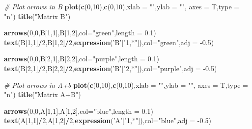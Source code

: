 \documentclass[
]{book}
\newenvironment{Shaded}{\begin{snugshade}}{\end{snugshade}}
\newcommand{\CommentTok}[1]{\textcolor[rgb]{0.56,0.35,0.01}{\textit{#1}}}
\newcommand{\DataTypeTok}[1]{\textcolor[rgb]{0.13,0.29,0.53}{#1}}
\newcommand{\DecValTok}[1]{\textcolor[rgb]{0.00,0.00,0.81}{#1}}
\newcommand{\FloatTok}[1]{\textcolor[rgb]{0.00,0.00,0.81}{#1}}
\newcommand{\KeywordTok}[1]{\textcolor[rgb]{0.13,0.29,0.53}{\textbf{#1}}}
\newcommand{\NormalTok}[1]{#1}
\newcommand{\OperatorTok}[1]{\textcolor[rgb]{0.81,0.36,0.00}{\textbf{#1}}}
\newcommand{\StringTok}[1]{\textcolor[rgb]{0.31,0.60,0.02}{#1}}
\theoremstyle{definition}
\theoremstyle{definition}
\theoremstyle{definition}
\theoremstyle{remark}
\begin{document}
\begin{Shaded}
\begin{Highlighting}[]
\CommentTok{# Plot arrows in B}
\KeywordTok{plot}\NormalTok{(}\KeywordTok{c}\NormalTok{(}\DecValTok{0}\NormalTok{,}\DecValTok{10}\NormalTok{),}\KeywordTok{c}\NormalTok{(}\DecValTok{0}\NormalTok{,}\DecValTok{10}\NormalTok{),}\DataTypeTok{xlab =} \StringTok{""}\NormalTok{,}\DataTypeTok{ylab =} \StringTok{""}\NormalTok{,}
 \DataTypeTok{axes =}\NormalTok{ T,}\DataTypeTok{type =} \StringTok{"n"}\NormalTok{)}
\KeywordTok{title}\NormalTok{(}\StringTok{"Matrix B"}\NormalTok{)}

\KeywordTok{arrows}\NormalTok{(}\DecValTok{0}\NormalTok{,}\DecValTok{0}\NormalTok{,B[}\DecValTok{1}\NormalTok{,}\DecValTok{1}\NormalTok{],B[}\DecValTok{1}\NormalTok{,}\DecValTok{2}\NormalTok{],}\DataTypeTok{col=}\StringTok{"green"}\NormalTok{,}\DataTypeTok{length =} \FloatTok{0.1}\NormalTok{)}
\KeywordTok{text}\NormalTok{(B[}\DecValTok{1}\NormalTok{,}\DecValTok{1}\NormalTok{]}\OperatorTok{/}\DecValTok{2}\NormalTok{,B[}\DecValTok{1}\NormalTok{,}\DecValTok{2}\NormalTok{]}\OperatorTok{/}\DecValTok{2}\NormalTok{,}\KeywordTok{expression}\NormalTok{(}\StringTok{'B'}\NormalTok{[}\StringTok{"1,*"}\NormalTok{]),}\DataTypeTok{col=}\StringTok{"green"}\NormalTok{,}\DataTypeTok{adj =} \FloatTok{-0.5}\NormalTok{)}

\KeywordTok{arrows}\NormalTok{(}\DecValTok{0}\NormalTok{,}\DecValTok{0}\NormalTok{,B[}\DecValTok{2}\NormalTok{,}\DecValTok{1}\NormalTok{],B[}\DecValTok{2}\NormalTok{,}\DecValTok{2}\NormalTok{],}\DataTypeTok{col=}\StringTok{"purple"}\NormalTok{,}\DataTypeTok{length =} \FloatTok{0.1}\NormalTok{)}
\KeywordTok{text}\NormalTok{(B[}\DecValTok{2}\NormalTok{,}\DecValTok{1}\NormalTok{]}\OperatorTok{/}\DecValTok{2}\NormalTok{,B[}\DecValTok{2}\NormalTok{,}\DecValTok{2}\NormalTok{]}\OperatorTok{/}\DecValTok{2}\NormalTok{,}\KeywordTok{expression}\NormalTok{(}\StringTok{'B'}\NormalTok{[}\StringTok{"2,*"}\NormalTok{]),}\DataTypeTok{col=}\StringTok{"purple"}\NormalTok{,}\DataTypeTok{adj =} \FloatTok{-0.5}\NormalTok{)}

\CommentTok{# Plot arrows in A+b}
\KeywordTok{plot}\NormalTok{(}\KeywordTok{c}\NormalTok{(}\DecValTok{0}\NormalTok{,}\DecValTok{10}\NormalTok{),}\KeywordTok{c}\NormalTok{(}\DecValTok{0}\NormalTok{,}\DecValTok{10}\NormalTok{),}\DataTypeTok{xlab =} \StringTok{""}\NormalTok{,}\DataTypeTok{ylab =} \StringTok{""}\NormalTok{,}
 \DataTypeTok{axes =}\NormalTok{ T,}\DataTypeTok{type =} \StringTok{"n"}\NormalTok{)}
\KeywordTok{title}\NormalTok{(}\StringTok{"Matrix A+B"}\NormalTok{)}


\KeywordTok{arrows}\NormalTok{(}\DecValTok{0}\NormalTok{,}\DecValTok{0}\NormalTok{,A[}\DecValTok{1}\NormalTok{,}\DecValTok{1}\NormalTok{],A[}\DecValTok{1}\NormalTok{,}\DecValTok{2}\NormalTok{],}\DataTypeTok{col=}\StringTok{"blue"}\NormalTok{,}\DataTypeTok{length =} \FloatTok{0.1}\NormalTok{)}
\KeywordTok{text}\NormalTok{(A[}\DecValTok{1}\NormalTok{,}\DecValTok{1}\NormalTok{]}\OperatorTok{/}\DecValTok{2}\NormalTok{,A[}\DecValTok{1}\NormalTok{,}\DecValTok{2}\NormalTok{]}\OperatorTok{/}\DecValTok{2}\NormalTok{,}\KeywordTok{expression}\NormalTok{(}\StringTok{'A'}\NormalTok{[}\StringTok{"1,*"}\NormalTok{]),}\DataTypeTok{col=}\StringTok{"blue"}\NormalTok{,}\DataTypeTok{adj =} \FloatTok{-0.5}\NormalTok{)}


\end{Highlighting}
\end{Shaded}
\end{document}
